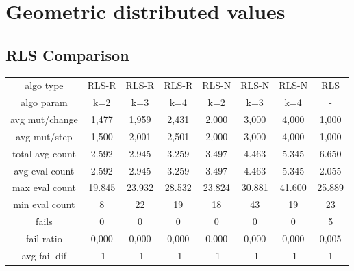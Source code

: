 \section{Geometric distributed values}

\subsection{RLS Comparison}

\begin{tabular}[h]{cccccccc}
algo type&         RLS-R&  RLS-R&  RLS-R&  RLS-N&  RLS-N&  RLS-N&    RLS\\
algo param&          k=2&    k=3&    k=4&    k=2&    k=3&    k=4&      -\\
avg mut/change&    1,477&  1,959&  2,431&  2,000&  3,000&  4,000&  1,000\\
avg mut/step&      1,500&  2,001&  2,501&  2,000&  3,000&  4,000&  1,000\\
\hline
total avg count&   2.592&  2.945&  3.259&  3.497&  4.463&  5.345&  6.650\\
avg eval count&    2.592&  2.945&  3.259&  3.497&  4.463&  5.345&  2.055\\
max eval count&   19.845& 23.932& 28.532& 23.824& 30.881& 41.600& 25.889\\
min eval count&        8&     22&     19&     18&     43&     19&     23\\
\hline
fails&                 0&      0&      0&      0&      0&      0&      5\\
fail ratio&        0,000&  0,000&  0,000&  0,000&  0,000&  0,000&  0,005\\
avg fail dif&         -1&     -1&     -1&     -1&     -1&     -1&      1\\
\end{tabular}


